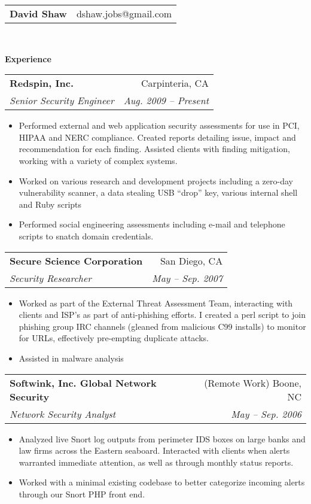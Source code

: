 \documentclass[letterpaper,11pt]{article}
\makeatletter
\newcommand{\resitem}[1]{\item #1 \vspace{-2pt}}
\newcommand{\resheading}[1]{{\large \colorbox{mygrey}{\begin{minipage}{\textwidth}{\textbf{#1 \vphantom{p\^{E}}}}\end{minipage}}}}
\newcommand{\ressubheading}[4]{
\begin{tabular*}{6.5in}{l@{\extracolsep{\fill}}r}
		\textbf{#1} & #2 \\
		\textit{#3} & \textit{#4} \\
\end{tabular*}\vspace{-6pt}}
\makeatother
\begin{document}
\thispagestyle{empty}
\newcommand{\mywebheader}{
\begin{tabular*}{7in}{l@{\extracolsep{\fill}}r}
	\textbf{{\LARGE David Shaw}} & {dshaw.jobs@gmail.com}
	\end{tabular*}
\\
\vspace{0.1in}}

\mywebheader

\resheading{Experience}
	\begin{description}
	\item\ressubheading{{Redspin, Inc.}}{Carpinteria, CA}{Senior Security Engineer}{Aug. 2009 -- Present}
				{ \footnotesize
				\begin{itemize}
					\resitem{Performed external and web application security assessments for use in PCI, HIPAA and NERC compliance. Created reports detailing issue, impact and recommendation for each finding. Assisted clients with finding mitigation, working with a variety of complex systems.}
					\resitem{Worked on various research and development projects including a zero-day vulnerability scanner, a data stealing USB ``drop'' key, various internal shell and Ruby scripts}
					\resitem{Performed social engineering assessments including e-mail and telephone scripts to snatch domain credentials.}
				\end{itemize}
				}
	\item\ressubheading{{Secure Science Corporation}}{San Diego, CA}{Security Researcher}{May -- Sep. 2007}
				{ \footnotesize
				\begin{itemize}
					\resitem{Worked as part of the External Threat Assessment Team, interacting with clients and ISP's as part of anti-phishing efforts. I created a perl script to join phishing group IRC channels (gleaned from malicious C99 installs) to monitor for URLs, effectively pre-empting duplicate attacks.}
					\resitem{Assisted in malware analysis}
				\end{itemize}
          			}
	\item\ressubheading{{Softwink, Inc. Global Network Security}}{(Remote Work) Boone, NC}{Network Security Analyst}{May -- Sep. 2006}
				{ \footnotesize
				\begin{itemize}
					\resitem{Analyzed live Snort log outputs from perimeter IDS boxes on large banks and law firms across the Eastern seaboard. Interacted with clients when alerts warranted immediate attention, as well as through monthly status reports.}
					\resitem{Worked with a minimal existing codebase to better categorize incoming alerts through our Snort PHP front end.}

\end{itemize}}
\end{description}
\end{document}
